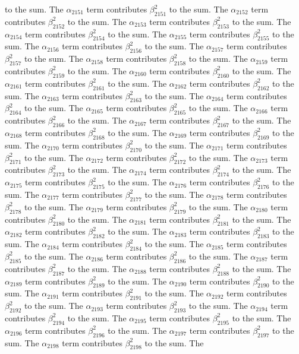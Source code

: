\begin{lemma}
to the sum. The $\alpha_{2151}$ term contributes $\beta_{2151}^{2}$ to the sum. The $\alpha_{2152}$ term contributes $\beta_{2152}^{2}$ to the sum. The $\alpha_{2153}$ term contributes $\beta_{2153}^{2}$ to the sum. The $\alpha_{2154}$ term contributes $\beta_{2154}^{2}$ to the sum. The $\alpha_{2155}$ term contributes $\beta_{2155}^{2}$ to the sum. The $\alpha_{2156}$ term contributes $\beta_{2156}^{2}$ to the sum. The $\alpha_{2157}$ term contributes $\beta_{2157}^{2}$ to the sum. The $\alpha_{2158}$ term contributes $\beta_{2158}^{2}$ to the sum. The $\alpha_{2159}$ term contributes $\beta_{2159}^{2}$ to the sum. The $\alpha_{2160}$ term contributes $\beta_{2160}^{2}$ to the sum. The $\alpha_{2161}$ term contributes $\beta_{2161}^{2}$ to the sum. The $\alpha_{2162}$ term contributes $\beta_{2162}^{2}$ to the sum. The $\alpha_{2163}$ term contributes $\beta_{2163}^{2}$ to the sum. The $\alpha_{2164}$ term contributes $\beta_{2164}^{2}$ to the sum. The $\alpha_{2165}$ term contributes $\beta_{2165}^{2}$ to the sum. The $\alpha_{2166}$ term contributes $\beta_{2166}^{2}$ to the sum. The $\alpha_{2167}$ term contributes $\beta_{2167}^{2}$ to the sum. The $\alpha_{2168}$ term contributes $\beta_{2168}^{2}$ to the sum. The $\alpha_{2169}$ term contributes $\beta_{2169}^{2}$ to the sum. The $\alpha_{2170}$ term contributes $\beta_{2170}^{2}$ to the sum. The $\alpha_{2171}$ term contributes $\beta_{2171}^{2}$ to the sum. The $\alpha_{2172}$ term contributes $\beta_{2172}^{2}$ to the sum. The $\alpha_{2173}$ term contributes $\beta_{2173}^{2}$ to the sum. The $\alpha_{2174}$ term contributes $\beta_{2174}^{2}$ to the sum. The $\alpha_{2175}$ term contributes $\beta_{2175}^{2}$ to the sum. The $\alpha_{2176}$ term contributes $\beta_{2176}^{2}$ to the sum. The $\alpha_{2177}$ term contributes $\beta_{2177}^{2}$ to the sum. The $\alpha_{2178}$ term contributes $\beta_{2178}^{2}$ to the sum. The $\alpha_{2179}$ term contributes $\beta_{2179}^{2}$ to the sum. The $\alpha_{2180}$ term contributes $\beta_{2180}^{2}$ to the sum. The $\alpha_{2181}$ term contributes $\beta_{2181}^{2}$ to the sum. The $\alpha_{2182}$ term contributes $\beta_{2182}^{2}$ to the sum. The $\alpha_{2183}$ term contributes $\beta_{2183}^{2}$ to the sum. The $\alpha_{2184}$ term contributes $\beta_{2184}^{2}$ to the sum. The $\alpha_{2185}$ term contributes $\beta_{2185}^{2}$ to the sum. The $\alpha_{2186}$ term contributes $\beta_{2186}^{2}$ to the sum. The $\alpha_{2187}$ term contributes $\beta_{2187}^{2}$ to the sum. The $\alpha_{2188}$ term contributes $\beta_{2188}^{2}$ to the sum. The $\alpha_{2189}$ term contributes $\beta_{2189}^{2}$ to the sum. The $\alpha_{2190}$ term contributes $\beta_{2190}^{2}$ to the sum. The $\alpha_{2191}$ term contributes $\beta_{2191}^{2}$ to the sum. The $\alpha_{2192}$ term contributes $\beta_{2192}^{2}$ to the sum. The $\alpha_{2193}$ term contributes $\beta_{2193}^{2}$ to the sum. The $\alpha_{2194}$ term contributes $\beta_{2194}^{2}$ to the sum. The $\alpha_{2195}$ term contributes $\beta_{2195}^{2}$ to the sum. The $\alpha_{2196}$ term contributes $\beta_{2196}^{2}$ to the sum. The $\alpha_{2197}$ term contributes $\beta_{2197}^{2}$ to the sum. The $\alpha_{2198}$ term contributes $\beta_{2198}^{2}$ to the sum. The 
\end{lemma}

